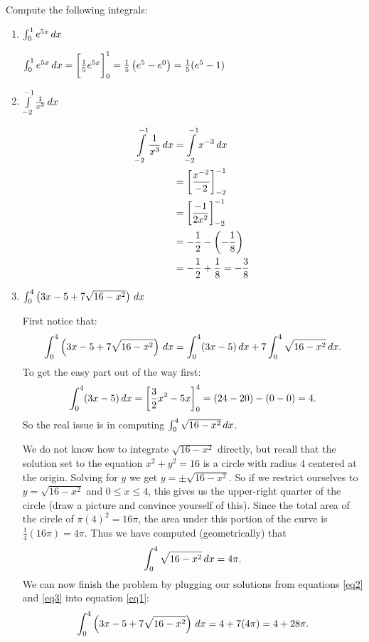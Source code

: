 \documentclass[handout,nooutcomes]{ximera}
\begin{document}
\begin{problem}
Compute the following integrals:
	\begin{enumerate}
	
	\item  $\int_0^1 e^{5x} \,d x$
		\begin{freeResponse}
		$\int_0^1 e^{5x} \,d x  = \bigg[ \frac{1}{5} e^{5x} \bigg]_0^1= \frac{1}{5} \left( e^5 - e^0 \right) = \frac{1}{5} (e^5 - 1)$
		\end{freeResponse}
		
		
		
	\item  $\int\limits_{-2}^{-1} \frac{1}{x^3} \,d x$
		\begin{freeResponse}
			\begin{align*}
			\int\limits_{-2}^{-1} \frac{1}{x^3} \,d x &= \int\limits_{-2}^{-1} x^{-3} \,d x  \\
			&= \bigg[ \frac{x^{-2}}{-2} \bigg]_{-2}^{-1}  \\
			&= \bigg[ \frac{-1}{2x^2} \bigg]_{-2}^{-1}  \\
			&= - \frac{1}{2} - \left( - \frac{1}{8} \right)  \\
			&= - \frac{1}{2} + \frac{1}{8} = - \frac{3}{8}
			\end{align*}
		\end{freeResponse}
		
		
		
	\item  $\int _0^4 \left( 3x - 5 + 7 \sqrt{16-x^2} \right) \,d x$
		\begin{freeResponse}
		First notice that:
		\begin{equation}\label{eq1}
		\int _0^4 \left( 3x - 5 + 7 \sqrt{16-x^2} \right) \,d x = \int_0^4 ( 3x - 5) \,d x + 7 \int_0^4 \sqrt{16-x^2} \,d x.
		\end{equation}
		To get the easy part out of the way first:
		\begin{equation}\label{eq2}
		\int_0^4 (3x-5) \,d x = \bigg[ \frac{3}{2} x^2 - 5x \bigg]_0^4 = (24 - 20) - (0-0) = 4. 
		\end{equation}
		So the real issue is in computing $\int_0^4 \sqrt{16-x^2} \,d x$.  
		
		We do not know how to integrate $\sqrt{16-x^2}$ directly, but recall that the solution set to the equation $x^2 + y^2 = 16$ is a circle with radius $4$ centered at the origin.  
		Solving for $y$ we get $y = \pm \sqrt{16-x^2}$.  
		So if we restrict ourselves to $y=\sqrt{16-x^2}$ and $0 \leq x \leq 4$, this gives us the upper-right quarter of the circle (draw a picture and convince yourself of this).  
		Since the total area of the circle of $\pi (4)^2 = 16\pi$, the area under this portion of the curve is $\frac{1}{4} (16\pi) = 4\pi$.  
		Thus we have computed (geometrically) that 
		\begin{equation}\label{eq3}
		\int_0^4 \sqrt{16-x^2} \,d x = 4\pi. 
		\end{equation}
		We can now finish the problem by plugging our solutions from equations \eqref{eq2} and \eqref{eq3} into equation \eqref{eq1}:
		$$\int _0^4 \left( 3x - 5 + 7 \sqrt{16-x^2} \right) \,d x = 4 + 7(4\pi) = 4 + 28\pi. $$
		\end{freeResponse}
		

\end{enumerate}
\end{problem}
\end{document}
